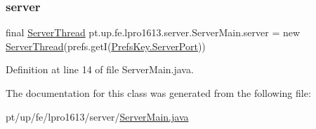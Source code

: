 \subsubsection{\texorpdfstring{server}{server}}
{\footnotesize\ttfamily final \hyperlink{classpt_1_1up_1_1fe_1_1lpro1613_1_1server_1_1conn_1_1_server_thread}{Server\+Thread} pt.\+up.\+fe.\+lpro1613.\+server.\+Server\+Main.\+server = new \hyperlink{classpt_1_1up_1_1fe_1_1lpro1613_1_1server_1_1conn_1_1_server_thread}{Server\+Thread}(prefs.\+getI(\hyperlink{enumpt_1_1up_1_1fe_1_1lpro1613_1_1server_1_1other_1_1_prefs_key_a92ee06ea77e828cd8272275f9309e142}{Prefs\+Key.\+Server\+Port}))\hspace{0.3cm}{\ttfamily [static]}}



Definition at line 14 of file Server\+Main.\+java.



The documentation for this class was generated from the following file\+:\begin{DoxyCompactItemize}
\item 
pt/up/fe/lpro1613/server/\hyperlink{_server_main_8java}{Server\+Main.\+java}\end{DoxyCompactItemize}
